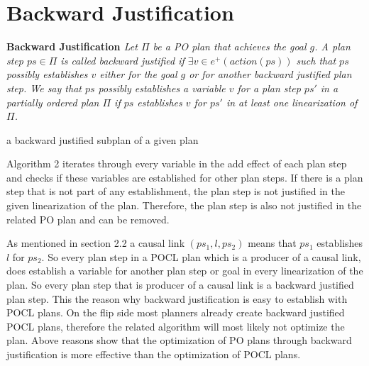 \section{Backward Justification} 

\begin{Definition}
    \normalfont \textbf{Backward Justification \cite{Justification}}
    \textit{Let $\Pi$ be a PO plan that achieves the goal $g$. A plan step $ps \in \Pi$
is called backward justified if $\exists v\in e^+(action(ps))$ such that $ps$
possibly establishes $v$ either for the goal $g$ or for another backward justified plan step. 
We say that $ps$ possibly establishes a variable $v$ for a plan step $ps'$ in
a partially ordered plan $\Pi$ if $ps$ establishes $v$ for $ps'$ in at
least one linearization of $\Pi$.
}
\end{Definition}
\begin{algorithm}[H]
    \SetAlgoLined
\vspace{2em}
\caption{\cite{Justification} a backward justified subplan of a given plan}
\end{algorithm}
Algorithm 2 iterates through every variable in the add effect of each plan step and checks if these variables are established for other plan steps.
If there is a plan step that is not part of any establishment, the plan step is not justified in the given linearization of the plan.
Therefore, the plan step is also not justified in the related PO plan and can be removed.


As mentioned in section 2.2 a causal link $(ps_1,l,ps_2)$ means that $ps_1$ establishes $l$ for $ps_2$.
So every plan step in a POCL plan which is a producer of a causal link, does establish a variable for another plan step or goal in 
every linearization of the plan. So every plan step that is producer of a causal link is a backward justified plan step.
This the reason why backward justification is easy to establish with POCL plans. On the flip side most planners already create backward justified POCL plans,
therefore the related algorithm will most likely not optimize the plan. Above reasons show that the optimization of PO plans through 
backward justification is more effective than the optimization of POCL plans. 


